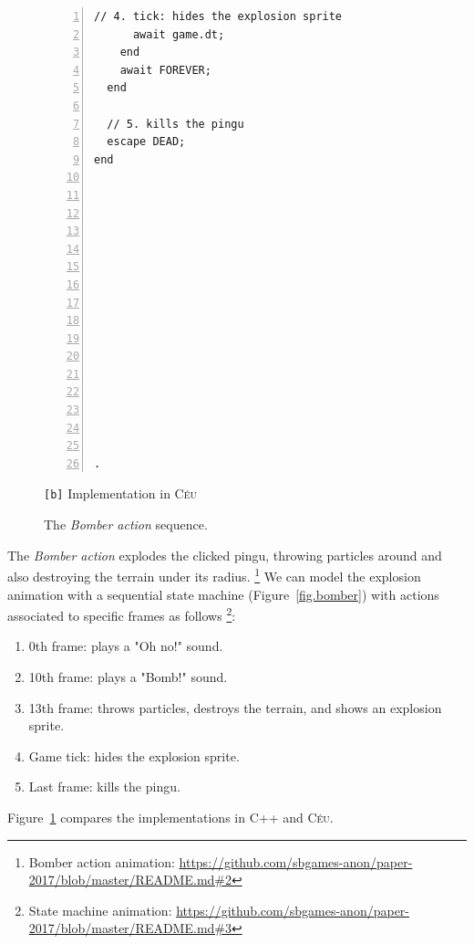 \documentclass{vgtc}                          %
\newcommand{\CEU}{\textsc{C\'{e}u}\xspace}
\newcommand{\code}[1] {{\small{\texttt{#1}}}}
\newcommand{\bx}{\code{[b]}\xspace}
\begin{document}
\begin{figure}[th!]
\begin{minipage}[t]{0.50\linewidth}
\begin{lstlisting}[numbers=left,xleftmargin=3em]
      // 4. tick: hides the explosion sprite
      await game.dt;
    end
    await FOREVER;
  end

  // 5. kills the pingu
  escape DEAD;
end
















.
\end{lstlisting}
\centering\small{\bx Implementation in \CEU}
\end{minipage}
\caption{ The \emph{Bomber action} sequence.
\label{lst.bomber}
}
\end{figure}

The \emph{Bomber action} explodes the clicked pingu, throwing particles around
and also destroying the terrain under its radius.%
\footnote{Bomber action animation: \url{https://github.com/sbgames-anon/paper-2017/blob/master/README.md#2} }
%
We can model the explosion animation with a sequential state machine
(Figure~\ref{fig.bomber}) with actions associated to specific frames as
follows%
\footnote{State machine animation: \url{https://github.com/sbgames-anon/paper-2017/blob/master/README.md#3} }:
%
\begin{enumerate}
\item 0th frame:  plays a "Oh no!" sound.
\item 10th frame: plays a "Bomb!" sound.
\item 13th frame: throws particles, destroys the terrain, and shows an
                  explosion sprite.
\item Game tick:  hides the explosion sprite.
\item Last frame: kills the pingu.
\end{enumerate}

Figure~\ref{lst.bomber} compares the implementations in C++ and \CEU.
\end{document}
